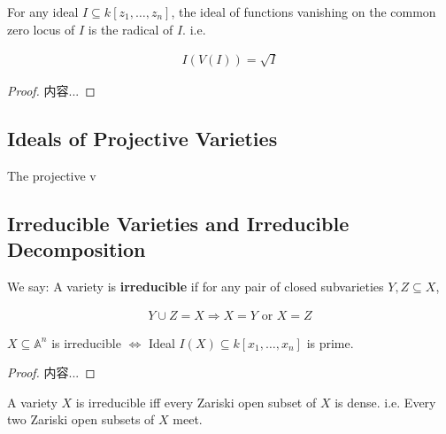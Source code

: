 \documentclass[Total.tex]{subfiles}
\begin{document}
		\begin{theorem}
			For any ideal $I\subseteq k[z_1,\dots,z_n]$, the ideal of functions vanishing on the common zero locus of $I$ is the radical of $I$. i.e.
			
			\begin{gather*}
				I(V(I))=\sqrt{I}
			\end{gather*}
		\end{theorem}
		
		\begin{proof}
			内容...
		\end{proof}
		
		\subsection{Ideals of Projective Varieties}
		
		\begin{Def}
			The projective v
		\end{Def}
		
		\begin{proposition}
			
		\end{proposition}
		
		\subsection{Irreducible Varieties and Irreducible Decomposition}
		
		\begin{Def}
			We say: A variety is \textbf{irreducible} if for any pair of closed subvarieties $Y,Z\subseteq X$,
			
			\begin{gather*}
				Y\cup Z=X\Rightarrow X=Y\mbox{ or }X=Z
			\end{gather*}
		\end{Def}
		
		\begin{lemma}
			$X\subseteq \mathbb{A}^n$ is irreducible $\Leftrightarrow$ Ideal $I(X)\subseteq k[x_1,\dots,x_n]$ is prime.
		\end{lemma}
		
		\begin{proof}
			内容...
		\end{proof}
		
		\begin{proposition}
			A variety $X$ is irreducible iff every Zariski open subset of $X$ is dense. i.e. Every two Zariski open subsets of $X$ meet.\label{Classical-Algebraic-Geometry-Zariski-Open-Subset-is-Dense}
		\end{proposition}
		
\end{document}
